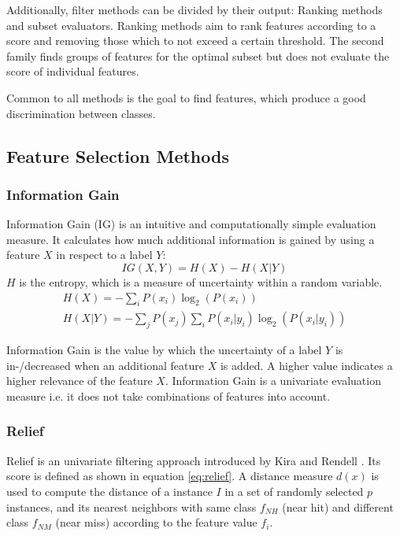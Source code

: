 Additionally, filter methods can be divided by their output: Ranking methods and subset evaluators. Ranking methods aim to rank features according to a score and removing those which to not exceed a certain threshold. The second family finds groups of features for the optimal subset but does not evaluate the score of individual features.

Common to all methods is the goal to find features, which produce a good discrimination between classes.

		\subsection{Feature Selection Methods}
			\label{sub:featureselectionmethods}
			\subsubsection{Information Gain}
			\label{subsubsec:infogain}

				Information Gain (IG) \cite{Cover91} is an intuitive and computationally simple evaluation measure. It calculates how much additional information is gained by using a feature $ X $ in respect to a label $ Y $:
				\begin{equation}
					IG(X,Y)=H(X)-H(X|Y)
				\end{equation}
				$ H $ is the entropy, which is a measure of uncertainty within a random variable.
				\begin{eqnarray}
					H(X)=-\sum \limits_{i}P(x_i) \log_2(P(x_i))\\
					H(X|Y) = -\sum \limits_{j}P(x_j)\sum \limits_{i}P(x_i|y_i) \log_2(P(x_i|	y_i))
				\end{eqnarray}
				
				Information Gain is the value by which the uncertainty of a label $ Y $ is \mbox{in-/decreased} when an additional feature $ X $ is added. A higher value indicates a higher relevance of the feature $ X $. Information Gain is a univariate evaluation measure i.e. it does not take combinations of features into account.

			\subsubsection{Relief}
			\label{subsubsec:relief}
			
				Relief is an univariate filtering approach introduced by Kira and Rendell \cite{Kira92}. Its score is defined as shown in equation \ref{eq:relief}. A distance measure $ d(x) $ is used to compute the distance of a instance $ I $ in a set of randomly selected $ p $ instances, and its nearest neighbors with same class $f_{NH}$ (near hit) and different class $f_{NM}$ (near miss) according to the feature value $ f_i $.
			
